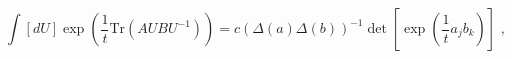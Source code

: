 \begin{equation}
\int [dU] \exp\left(\frac{1}{t} \mbox{Tr}(AUBU^{-1})\right) = c
(\Delta(a)\Delta(b))^{-1} \det\left[ \exp(\frac{1}{t}a_jb_k) \right]\,\,,
\end{equation}


